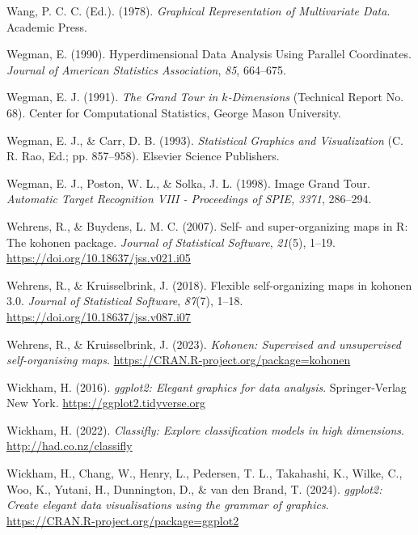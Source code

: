 \documentclass[
  letterpaper,
]{krantz}
\newlength{\cslhangindent}
\newenvironment{CSLReferences}[2] %
 {\begin{list}{}{%
  \setlength{\itemindent}{0pt}
  \setlength{\leftmargin}{0pt}
  \setlength{\parsep}{0pt}
  \ifodd #1
   \setlength{\leftmargin}{\cslhangindent}
   \setlength{\itemindent}{-1\cslhangindent}
  \fi
  \setlength{\itemsep}{#2\baselineskip}}}
 {\end{list}}
\begin{document}
\begin{CSLReferences}{1}{0}
Wang, P. C. C. (Ed.). (1978). \emph{{G}raphical {R}epresentation of
{M}ultivariate {D}ata}. Academic Press.

Wegman, E. (1990). {H}yperdimensional {D}ata {A}nalysis {U}sing
{P}arallel {C}oordinates. \emph{Journal of American Statistics
Association}, \emph{85}, 664--675.

Wegman, E. J. (1991). \emph{The {G}rand {T}our in \(k\)-{D}imensions}
(Technical Report No. 68). Center for Computational Statistics, George
Mason University.

Wegman, E. J., \& Carr, D. B. (1993). \emph{{S}tatistical {G}raphics and
{V}isualization} (C. R. Rao, Ed.; pp. 857--958). Elsevier Science
Publishers.

Wegman, E. J., Poston, W. L., \& Solka, J. L. (1998). Image {G}rand
{T}our. \emph{Automatic Target Recognition VIII - Proceedings of SPIE,
3371}, 286--294.

Wehrens, R., \& Buydens, L. M. C. (2007). Self- and super-organizing
maps in {R}: The {kohonen} package. \emph{Journal of Statistical
Software}, \emph{21}(5), 1--19.
\url{https://doi.org/10.18637/jss.v021.i05}

Wehrens, R., \& Kruisselbrink, J. (2018). Flexible self-organizing maps
in {kohonen} 3.0. \emph{Journal of Statistical Software}, \emph{87}(7),
1--18. \url{https://doi.org/10.18637/jss.v087.i07}

Wehrens, R., \& Kruisselbrink, J. (2023). \emph{Kohonen: Supervised and
unsupervised self-organising maps}.
\url{https://CRAN.R-project.org/package=kohonen}

Wickham, H. (2016). \emph{ggplot2: Elegant graphics for data analysis}.
Springer-Verlag New York. \url{https://ggplot2.tidyverse.org}

Wickham, H. (2022). \emph{Classifly: Explore classification models in
high dimensions}. \url{http://had.co.nz/classifly}

Wickham, H., Chang, W., Henry, L., Pedersen, T. L., Takahashi, K.,
Wilke, C., Woo, K., Yutani, H., Dunnington, D., \& van den Brand, T.
(2024). \emph{ggplot2: Create elegant data visualisations using the
grammar of graphics}. \url{https://CRAN.R-project.org/package=ggplot2}


\end{CSLReferences}
\end{document}
